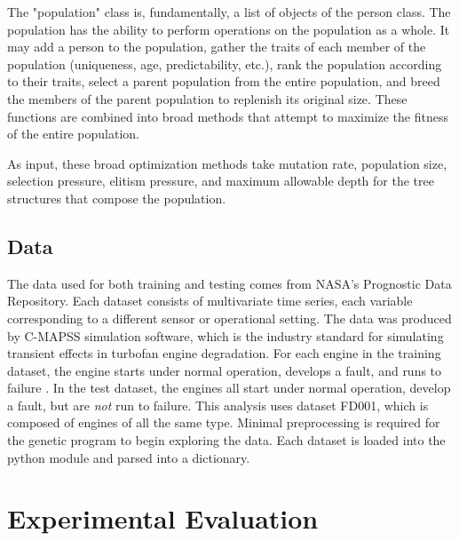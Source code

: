 \documentclass{acm_proc_article-sp}
\begin{document}
The "population" class is, fundamentally, a list of objects of the person class. The population has the ability to perform operations on the population as a whole. It may add a person to the population, gather the traits of each member of the population (uniqueness, age, predictability, etc.), rank the population according to their traits, select a parent population from the entire population, and breed the members of the parent population to replenish its original size. These functions are combined into broad methods that attempt to maximize the fitness of the entire population.

As input, these broad optimization methods take mutation rate, population size, selection pressure, elitism pressure, and maximum allowable depth for the tree structures that compose the population.

\subsection{Data}
The data used for both training and testing comes from NASA's Prognostic Data Repository. Each dataset consists of 	multivariate time series, each variable corresponding to a different sensor or operational setting. The data was produced by C-MAPSS simulation software, which is the industry standard for simulating transient effects in turbofan engine degradation. For each engine in the training dataset, the engine starts under normal operation, develops a fault, and runs to failure \cite{nasa} \cite{Mog}. In the test dataset, the engines all start under normal operation, develop a fault, but are {\it{not}} run to failure. This analysis uses dataset FD001, which is composed of engines of all the same type. Minimal preprocessing is required for the genetic program to begin exploring the data. Each dataset is loaded into the python module and parsed into a dictionary.

\clearpage
\section{Experimental Evaluation}
\end{document}
